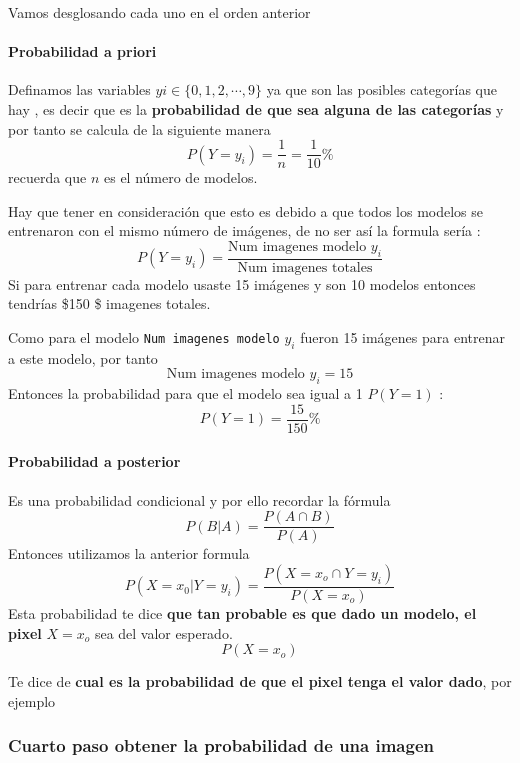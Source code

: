 \documentclass[
  spanish,
]{article}
\begin{document}
Vamos desglosando cada uno en el orden anterior

\hypertarget{probabilidad-a-priori}{%
\paragraph{Probabilidad a priori}\label{probabilidad-a-priori}}

Definamos las variables \(yi \in \{0,1,2,\cdots,9\}\) ya que son las
posibles categorías que hay , es decir que es la \textbf{probabilidad de
que sea alguna de las categorías} y por tanto se calcula de la siguiente
manera \[
P(Y=y_i)=\frac{1}{n}=\frac{1}{10}\%
\] recuerda que \(n\) es el número de modelos.

Hay que tener en consideración que esto es debido a que todos los
modelos se entrenaron con el mismo número de imágenes, de no ser así la
formula sería : \[
P(Y=y_i)=\frac{\text{Num imagenes modelo }y_i}{\text{Num imagenes totales}}
\] Si para entrenar cada modelo usaste 15 imágenes y son 10 modelos
entonces tendrías \$150 \$ imagenes totales.

Como para el modelo \texttt{Num\ imagenes\ modelo} \(y_i\) fueron 15
imágenes para entrenar a este modelo, por tanto \[
\text{Num imagenes modelo }y_i=15
\] Entonces la probabilidad para que el modelo sea igual a 1 \(P(Y=1)\)
: \[
P(Y=1)=\frac{15}{150}\%
\]

\hypertarget{probabilidad-a-posterior}{%
\paragraph{Probabilidad a posterior}\label{probabilidad-a-posterior}}

Es una probabilidad condicional y por ello recordar la fórmula \[
P(B|A)=\frac{P(A\cap B)}{P(A)}
\] Entonces utilizamos la anterior formula \[
P(X=x_0| Y=y_i)=\frac{P(X=x_o\cap Y=y_i)}{P(X=x_o)}
\] Esta probabilidad te dice \textbf{que tan probable es que dado un
modelo, el pixel } \(X=x_o\) sea del valor esperado. \[
P(X=x_o)
\]

Te dice de \textbf{cual es la probabilidad de que el pixel tenga el
valor dado}, por ejemplo

\hypertarget{cuarto-paso-obtener-la-probabilidad-de-una-imagen}{%
\subsubsection{Cuarto paso obtener la probabilidad de una
imagen}\label{cuarto-paso-obtener-la-probabilidad-de-una-imagen}}
\end{document}
